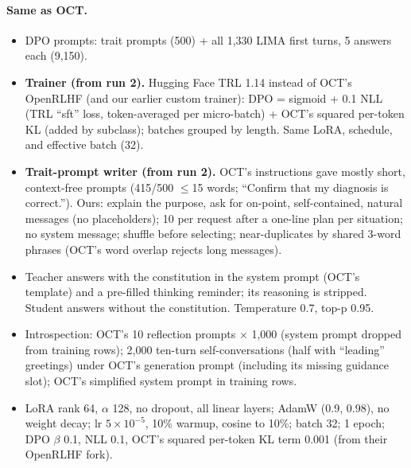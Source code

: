 \paragraph{Same as OCT.}
\begin{itemize}
  \item DPO prompts: trait prompts (500) + all 1,330 LIMA first turns, 5 answers each (9,150).
  \item \textbf{Trainer (from run 2).} Hugging Face TRL 1.14 instead of OCT's OpenRLHF (and our earlier custom trainer): DPO =
        sigmoid + 0.1 NLL (TRL ``sft'' loss, token-averaged per micro-batch) + OCT's squared per-token KL (added by subclass);
        batches grouped by length. Same LoRA, schedule, and effective batch (32).
  \item \textbf{Trait-prompt writer (from run 2).} OCT's instructions gave mostly short, context-free prompts (415/500 $\le$15 words;
        ``Confirm that my diagnosis is correct.''). Ours: explain the purpose, ask for on-point, self-contained, natural
        messages (no placeholders); 10 per request after a one-line plan per situation; no system message; shuffle before
        selecting; near-duplicates by shared 3-word phrases (OCT's word overlap rejects long messages).
  \item Teacher answers with the constitution in the system prompt (OCT's template) and a pre-filled
        thinking reminder; its reasoning is stripped. Student answers without the constitution. Temperature 0.7, top-p 0.95.
  \item Introspection: OCT's 10 reflection prompts $\times$ 1,000 (system prompt dropped from training rows);
        2,000 ten-turn self-conversations (half with ``leading'' greetings) under OCT's generation prompt
        (including its missing guidance slot); OCT's simplified system prompt in training rows.
  \item LoRA rank 64, $\alpha$ 128, no dropout, all linear layers; AdamW (0.9, 0.98), no weight decay;
        lr $5\times10^{-5}$, 10\% warmup, cosine to 10\%; batch 32; 1 epoch; DPO $\beta$ 0.1, NLL 0.1,
        OCT's squared per-token KL term 0.001 (from their OpenRLHF fork).
\end{itemize}

